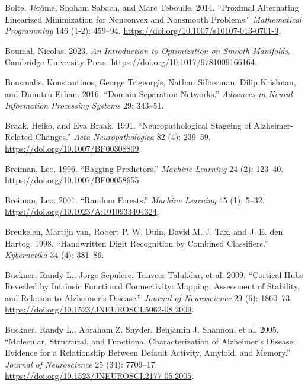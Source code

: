 \documentclass[
  10pt,
  letterpaper,
]{report}
\newlength{\cslhangindent}
\newenvironment{CSLReferences}[2] %
 {\begin{list}{}{%
  \setlength{\itemindent}{0pt}
  \setlength{\leftmargin}{0pt}
  \setlength{\parsep}{0pt}
  \ifodd #1
   \setlength{\leftmargin}{\cslhangindent}
   \setlength{\itemindent}{-1\cslhangindent}
  \fi
  \setlength{\itemsep}{#2\baselineskip}}}
 {\end{list}}
\begin{document}
\begin{CSLReferences}{1}{1}
Bolte, Jérôme, Shoham Sabach, and Marc Teboulle. 2014. {``Proximal
Alternating Linearized Minimization for Nonconvex and Nonsmooth
Problems.''} \emph{Mathematical Programming} 146 (1-2): 459--94.
\url{https://doi.org/10.1007/s10107-013-0701-9}.

Boumal, Nicolas. 2023. \emph{An Introduction to Optimization on Smooth
Manifolds}. Cambridge University Press.
\url{https://doi.org/10.1017/9781009166164}.

Bousmalis, Konstantinos, George Trigeorgis, Nathan Silberman, Dilip
Krishnan, and Dumitru Erhan. 2016. {``Domain Separation Networks.''}
\emph{Advances in Neural Information Processing Systems} 29: 343--51.

Braak, Heiko, and Eva Braak. 1991. {``Neuropathological Stageing of
{Alzheimer}-Related Changes.''} \emph{Acta Neuropathologica} 82 (4):
239--59. \url{https://doi.org/10.1007/BF00308809}.

Breiman, Leo. 1996. {``Bagging Predictors.''} \emph{Machine Learning} 24
(2): 123--40. \url{https://doi.org/10.1007/BF00058655}.

Breiman, Leo. 2001. {``Random Forests.''} \emph{Machine Learning} 45
(1): 5--32. \url{https://doi.org/10.1023/A:1010933404324}.

Breukelen, Martijn van, Robert P. W. Duin, David M. J. Tax, and J. E.
den Hartog. 1998. {``Handwritten Digit Recognition by Combined
Classifiers.''} \emph{Kybernetika} 34 (4): 381--86.

Buckner, Randy L., Jorge Sepulcre, Tanveer Talukdar, et al. 2009.
{``Cortical Hubs Revealed by Intrinsic Functional Connectivity: Mapping,
Assessment of Stability, and Relation to {Alzheimer's} Disease.''}
\emph{Journal of Neuroscience} 29 (6): 1860--73.
\url{https://doi.org/10.1523/JNEUROSCI.5062-08.2009}.

Buckner, Randy L., Abraham Z. Snyder, Benjamin J. Shannon, et al. 2005.
{``Molecular, Structural, and Functional Characterization of
{Alzheimer's} Disease: Evidence for a Relationship Between Default
Activity, Amyloid, and Memory.''} \emph{Journal of Neuroscience} 25
(34): 7709--17. \url{https://doi.org/10.1523/JNEUROSCI.2177-05.2005}.


\end{CSLReferences}
\end{document}
